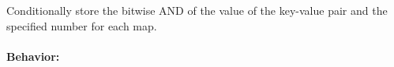 Conditionally store the bitwise AND of the value of the key-value pair and the
specified number for each map.

\paragraph{Behavior:}
\begin{itemize}[noitemsep]



\end{itemize}
